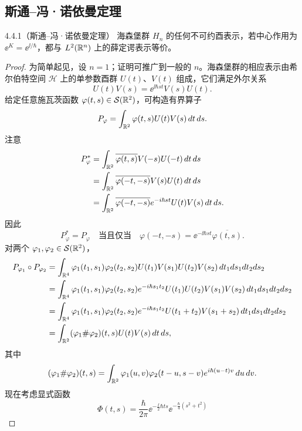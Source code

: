 \subsection{斯通–冯·诺依曼定理}

\begin{theorem}{4.4.1}（斯通–冯·诺依曼定理）
  海森堡群 $H_n$ 的任何不可约酉表示，若中心作用为 $\ee^K=\ee^{\ii/\hbar}$，都与 $L^2(\mathbb{R}^n)$ 上的薛定谔表示等价。
\end{theorem}

\begin{proof}
  为简单起见，设 $n=1$；证明可推广到一般的 $n$。海森堡群的相应表示由希尔伯特空间 $\mathcal{H}$ 上的单参数酉群 $U(t)$、$V(t)$ 组成，它们满足外尔关系
  \[
  U(t)V(s)=\ee^{\ii\hbar st}V(s)U(t).
  \]
  给定任意施瓦茨函数 $\varphi(t,s)\in\mathcal{S}(\mathbb{R}^2)$，可构造有界算子
  \[
  P_\varphi=\int_{\mathbb{R}^2}\varphi(t,s)U(t)V(s)\,d t\,d s.
  \]
  注意
  \begin{align*}
  P_\varphi^*
  &=\int_{\mathbb{R}^2}\overline{\varphi(t,s)}V(-s)U(-t)\,d t\,d s\\
  &=\int_{\mathbb{R}^2}\overline{\varphi(-t,-s)}V(s)U(t)\,d t\,d s\\
  &=\int_{\mathbb{R}^2}\overline{\varphi(-t,-s)}e^{-i\hbar st}U(t)V(s)\,d t\,d s.
  \end{align*}
  因此
  \[
  P_\varphi^*=P_\varphi
  \quad\text{当且仅当}\quad
  \varphi(-t,-s)=\ee^{-\ii\hbar st}\overline{\varphi(t,s)}.
  \]
  对两个 $\varphi_1,\varphi_2\in\mathcal{S}(\mathbb{R}^2)$，
  \begin{align*}
  P_{\varphi_1}\circ P_{\varphi_2}
  &=\int_{\mathbb{R}^4}\varphi_1(t_1,s_1)\varphi_2(t_2,s_2)U(t_1)V(s_1)U(t_2)V(s_2)\,d t_1d s_1d t_2d s_2\\
  &=\int_{\mathbb{R}^4}\varphi_1(t_1,s_1)\varphi_2(t_2,s_2)e^{-i\hbar s_1t_2}U(t_1)U(t_2)V(s_1)V(s_2)\,d t_1d s_1d t_2d s_2\\
  &=\int_{\mathbb{R}^4}\varphi_1(t_1,s_1)\varphi_2(t_2,s_2)e^{-i\hbar s_1t_2}U(t_1+t_2)V(s_1+s_2)\,d t_1d s_1d t_2d s_2\\
  &=\int_{\mathbb{R}^2}(\varphi_1\#\varphi_2)(t,s)U(t)V(s)\,d t\,d s,
  \end{align*}
  其中
  \[
  (\varphi_1\#\varphi_2)(t,s)=\int_{\mathbb{R}^2}\varphi_1(u,v)\varphi_2(t-u,s-v)e^{i\hbar(u-t)v}\,d u\,d v.
  \]
  现在考虑显式函数
  \[
  \boxed{\ \Phi(t,s)=\frac{\hbar}{2\pi}\ee^{-\frac{\ii}{2}\hbar ts}\ee^{-\frac{\hbar}{4}(s^2+t^2)}\ }
\]
\end{proof}
